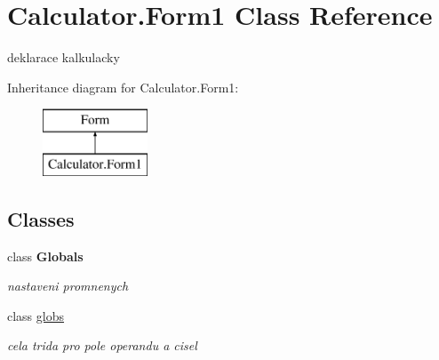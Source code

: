 \hypertarget{class_calculator_1_1_form1}{}\section{Calculator.\+Form1 Class Reference}
\label{class_calculator_1_1_form1}


deklarace kalkulacky  


Inheritance diagram for Calculator.\+Form1\+:\begin{figure}[H]
\begin{center}
\leavevmode
\includegraphics[height=2.000000cm]{class_calculator_1_1_form1}
\end{center}
\end{figure}
\subsection*{Classes}
\begin{DoxyCompactItemize}
\item 
class {\bfseries Globals}
\begin{DoxyCompactList}\small\item\em nastaveni promnenych \end{DoxyCompactList}\item 
class \hyperlink{class_calculator_1_1_form1_1_1globs}{globs}
\begin{DoxyCompactList}\small\item\em cela trida pro pole operandu a cisel \end{DoxyCompactList}\end{DoxyCompactItemize}
